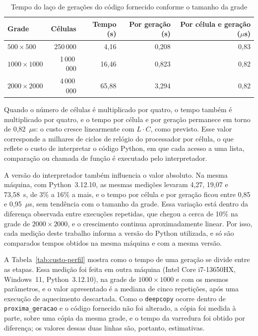\begin{table}[htb]
    \centering
    \caption{Tempo do laço de gerações do código fornecido conforme o tamanho da grade}
    \label{tab:custo-escala}
    \begin{tabular}{lrrrr}
        \toprule
        \textbf{Grade} & \textbf{Células} & \textbf{Tempo (s)} & \textbf{Por geração (s)} & \textbf{Por célula e geração ($\mu$s)} \\
        \midrule
        $500 \times 500$   & 250\,000     & 4,16  & 0,208 & 0,83 \\
        $1000 \times 1000$ & 1\,000\,000  & 16,46 & 0,823 & 0,82 \\
        $2000 \times 2000$ & 4\,000\,000  & 65,88 & 3,294 & 0,82 \\
        \bottomrule
    \end{tabular}
    \fonte{}
\end{table}

Quando o número de células é multiplicado por quatro, o tempo também é multiplicado por quatro, e o tempo por célula e por geração permanece em torno de 0,82~$\mu$s: o custo cresce linearmente com $L \cdot C$, como previsto. Esse valor corresponde a milhares de ciclos de relógio do processador por célula, o que reflete o custo de interpretar o código Python, em que cada acesso a uma lista, comparação ou chamada de função é executado pelo interpretador.

A versão do interpretador também influencia o valor absoluto. Na mesma máquina, com Python~3.12.10, as mesmas medições levaram 4,27, 19,07 e 73,58~s, de 3\% a 16\% a mais, e o tempo por célula e por geração ficou entre 0,85 e 0,95~$\mu$s, sem tendência com o tamanho da grade. Essa variação está dentro da diferença observada entre execuções repetidas, que chegou a cerca de 10\% na grade de $2000 \times 2000$, e o crescimento continua aproximadamente linear. Por isso, cada medição deste trabalho informa a versão do Python utilizada, e só são comparados tempos obtidos na mesma máquina e com a mesma versão.

A Tabela~\ref{tab:custo-perfil} mostra como o tempo de uma geração se divide entre as etapas. Essa medição foi feita em outra máquina (Intel Core i7-13650HX, Windows~11, Python~3.12.10), na grade de $1000 \times 1000$ e com os mesmos parâmetros, e o valor apresentado é a mediana de cinco repetições, após uma execução de aquecimento descartada. Como o \texttt{deepcopy} ocorre dentro de \texttt{proxima\_geracao} e o código fornecido não foi alterado, a cópia foi medida à parte, sobre uma cópia da mesma grade, e o tempo da varredura foi obtido por diferença; os valores dessas duas linhas são, portanto, estimativas.

